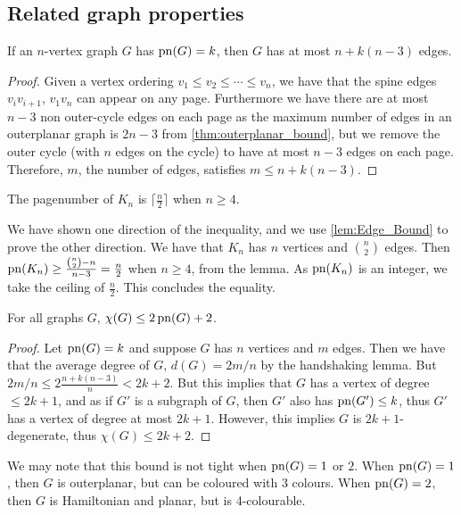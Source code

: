 \subsection{Related graph properties}\label{ssec:Related_Properties}

\begin{lemma}\label{lem:Edge_Bound}
	If an \(n\)-vertex graph \(G\) has \(\operatorname{pn}(G) = k\), then \(G\) has at most \(n + k(n-3)\) edges.
\end{lemma}
\begin{proof}
	Given a vertex ordering \(v_1 \leq v_2 \leq \cdots \leq v_n\), we have that the spine edges \(v_i v_{i + 1}\), \(v_1 v_n\)  can appear on any page. Furthermore we have there are at most \(n-3\) non outer-cycle edges on each page as the maximum number of edges in an outerplanar graph is \(2n - 3\) from \cref{thm:outerplanar_bound}, but we remove the outer cycle (with \(n\) edges on the cycle) to have at most \(n-3\) edges on each page. Therefore, \(m\), the number of edges, satisfies \(m \leq n + k (n - 3)\). 
\end{proof}
\begin{corollary}
	The pagenumber of \(K_n\) is \(\lceil \frac{n}{2} \rceil \) when \(n \geq 4\).
\end{corollary}
We have shown one direction of the inequality, and we use \cref{lem:Edge_Bound} to prove the other direction. We have that \(K_n\) has \(n\) vertices and \(\binom{n}{2}\) edges. Then \(\operatorname{pn}(K_n) \geq \frac{\binom{n}{2} - n}{n - 3} = \frac{n}{2}\) when \(n \geq 4\), from the lemma. As \(\operatorname{pn}(K_n)\) is an integer, we take the ceiling of \(\frac{n}{2}\). This concludes the equality. 
\begin{theorem}\label{thm:Colouring_Bound}
	For all graphs \(G\), \(\chi(G) \leq 2 \operatorname{pn}(G) + 2\).
\end{theorem}
\begin{proof}
	Let \(\operatorname{pn}(G) = k\) and suppose \(G\) has \(n\) vertices and \(m\) edges. Then we have that the average degree of \(G\), \(d(G) = 2m/n\) by the handshaking lemma. But \(2m/n \leq 2 \frac{n + k(n-3)}{n} < 2k + 2\). But this implies that \(G\) has a vertex of degree \(\leq 2k + 1\), and as if \(G'\) is a subgraph of \(G\), then \(G'\) also has \(\operatorname{pn}(G') \leq k\), thus \(G'\) has a vertex of degree at most \(2k + 1\). However, this implies \(G\) is \(2k + 1\)-degenerate, thus \(\chi(G) \leq 2k + 2\). 
\end{proof}
We may note that this bound is not tight when \(\operatorname{pn}(G) = 1\) or \(2\). When \(\operatorname{pn}(G) = 1\), then \(G\) is outerplanar, but can be coloured with 3 colours. When \(\operatorname{pn}(G) = 2\), then \(G\) is Hamiltonian and planar, but is 4-colourable. 

